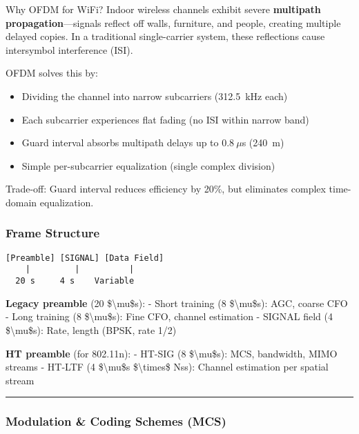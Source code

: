 \begin{calloutbox}[colback=blue!5!white,colframe=blue!75!black]{Why OFDM for WiFi?}
Indoor wireless channels exhibit severe \textbf{multipath propagation}---signals reflect off walls, furniture, and people, creating multiple delayed copies. In a traditional single-carrier system, these reflections cause intersymbol interference (ISI).

OFDM solves this by:
\begin{itemize}
\item Dividing the channel into narrow subcarriers (312.5~kHz each)
\item Each subcarrier experiences flat fading (no ISI within narrow band)
\item Guard interval absorbs multipath delays up to $0.8~\mu$s (240~m)
\item Simple per-subcarrier equalization (single complex division)
\end{itemize}

Trade-off: Guard interval reduces efficiency by 20\%, but eliminates complex time-domain equalization.
\end{calloutbox}

\subsubsection{Frame Structure}\label{frame-structure}

\begin{verbatim}
[Preamble] [SIGNAL] [Data Field]
    |         |          |
  20 s     4 s    Variable
\end{verbatim}

\textbf{Legacy preamble} (20 \$\textbackslash mu\$s): - Short training
(8 \$\textbackslash mu\$s): AGC, coarse CFO - Long training (8
\$\textbackslash mu\$s): Fine CFO, channel estimation - SIGNAL field (4
\$\textbackslash mu\$s): Rate, length (BPSK, rate 1/2)

\textbf{HT preamble} (for 802.11n): - HT-SIG (8 \$\textbackslash mu\$s):
MCS, bandwidth, MIMO streams - HT-LTF (4 \$\textbackslash mu\$s
\$\textbackslash times\$ Nss): Channel estimation per spatial stream

\begin{center}\rule{0.5\linewidth}{0.5pt}\end{center}

\subsubsection{Modulation \& Coding Schemes
(MCS)}\label{modulation-coding-schemes-mcs}

